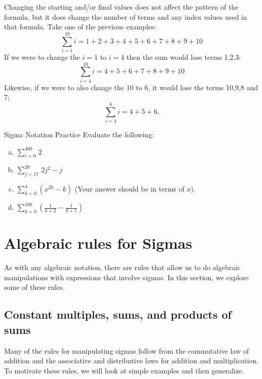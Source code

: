 Changing the starting and/or final values does not affect the pattern of the formula, but it does change the number of terms and any index values used in that formula.  Take one of the previous examples:
\[\sum _{i=1}^{10}i = 1 + 2 + 3 + 4 + 5 + 6 + 7 + 8 + 9 + 10\]
If we were to change the $i=1$ to $i=4$ then the sum would lose terms 1,2,3:
\[\sum _{i=4}^{10}i = 4 + 5 + 6 + 7 + 8 + 9 + 10\]
Likewise, if we were to also change the 10 to 6, it would lose the terms 10,9,8 and 7;
\[\sum _{i=4}^{6}i = 4 + 5 + 6.\]

\begin{exercise}{Sigma Notation Practice}
Evaluate the following:
\begin{enumerate}[(a)]
\item
$\displaystyle{\sum _{i=0}^{400} \,2}$
\item
$\displaystyle{ \sum_{j=17}^{20} \, 2j^2 - j}$
\item
$\displaystyle{ \sum_{k=0}^{4}(x^{2k} - k)}$  \quad (Your answer should be in terms of  $x$).
\item
$\displaystyle{ \sum_{k=0}^{100} \left(\frac{1}{k+2} - \frac{1}{k+1}\right)}$
\end {enumerate}
\end{exercise}

\section{Algebraic rules for Sigmas} 
\label{sec:SigmaNotation:Properties}

As with any algebraic notation, there are rules that allow us to do algebraic manipulations with expressions that involve sigmas. In this section, we explore some of these rules.

\subsection{Constant multiples, sums, and products of sums}

Many of the rules for manipulating sigmas follow from the commutative law of addition and the associative and distributive laws for addition and multiplication. To motivate these rules, we will look at simple examples and then generalize.

